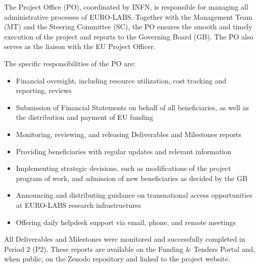 
The Project Office (PO), coordinated by INFN, is responsible for managing all administrative processes of EURO-LABS. Together with the Management Team (MT) and the Steering Committee (SC), the PO ensures the smooth and timely execution of the project and reports to the Governing Board (GB). The PO also serves as the liaison with the EU Project Officer.

The specific responsibilities of the PO are:

\begin{itemize}
    \item Financial oversight, including resource utilization, cost tracking and reporting, reviews
    \item Submission of Financial Statements on behalf of all beneficiaries, as well as the distribution and payment of EU funding
    \item Monitoring, reviewing, and releasing Deliverables and Milestones reports
    \item Providing beneficiaries with regular updates and relevant information
    \item Implementing strategic decisions, such as modifications of the project program of work, and admission of new beneficiaries as decided by the GB
    \item Announcing and distributing guidance on transnational access opportunities at EURO-LABS research infrastructures
    \item Offering daily helpdesk support via email, phone, and remote meetings
\end{itemize}

All Deliverables and Milestones were monitored and successfully completed in Period 2 (P2). These reports are available on the Funding \& Tenders Portal and, when public, on the Zenodo repository and linked to the project website.


